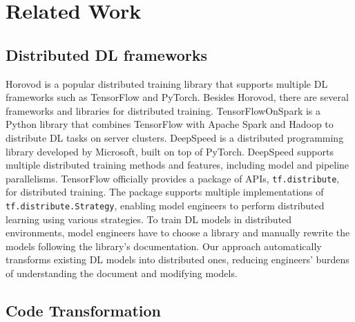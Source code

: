 \section{Related Work}\label{sec:related}

\subsection{Distributed DL frameworks}

Horovod\cite{sergeev2018horovod} is a popular distributed training library that
supports multiple DL frameworks such as TensorFlow and PyTorch.
Besides Horovod, there are several frameworks and libraries for distributed
training.
TensorFlowOnSpark\cite{tfonspark} is a Python library that
combines TensorFlow with Apache Spark and Hadoop to distribute
DL tasks on server clusters. 
DeepSpeed\cite{deepspeed} is a distributed programming library developed by
Microsoft, built on top of PyTorch\cite{pytorch2019}.  
DeepSpeed supports multiple distributed training methods and features,
including model and pipeline parallelisms. 
TensorFlow officially provides a package of APIs, {\tt tf.distribute}, for
distributed training\cite{tfdistributed}.
The package supports multiple implementations of {\tt tf.distribute.Strategy},
enabling model engineers to perform distributed learning using various
strategies.
To train DL models in distributed environments, model engineers have to choose
a library and manually rewrite the models following the library's documentation.
Our approach automatically transforms existing DL models into distributed ones,
reducing engineers' burdens of understanding the document and modifying models.


\subsection{Code Transformation}

